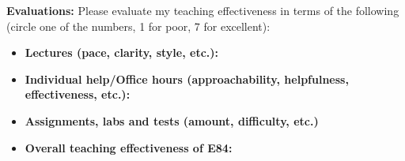 \begin{enumerate}


\end{enumerate}




\item {\bf Evaluations:} Please evaluate my teaching effectiveness in terms 
of the following (circle one of the numbers, 1 for poor, 7 for excellent):

\begin{itemize}
\item {\bf Lectures (pace, clarity, style, etc.):}


\item {\bf Individual help/Office hours (approachability, helpfulness, effectiveness, etc.):}


\item {\bf Assignments, labs and tests (amount, difficulty, etc.)}


\item {\bf Overall teaching effectiveness of E84:} 


\end{itemize}


